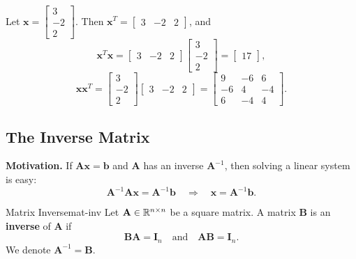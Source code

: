 \begin{example}
  Let $\mathbf{x} =
    \begin{bmatrix}
      3 \\ -2 \\ 2
    \end{bmatrix}
  $. Then $\mathbf{x}^T =
    \begin{bmatrix}
      3 & -2 & 2
    \end{bmatrix}
  $, and
  \[
    \mathbf{x}^T \mathbf{x}
    =
    \begin{bmatrix}
      3 & -2 & 2
    \end{bmatrix}
    \begin{bmatrix}
      3 \\ -2 \\ 2
    \end{bmatrix}
    =
    \begin{bmatrix}
      17
    \end{bmatrix}
    ,
  \]
  \[
    \mathbf{x}\mathbf{x}^T
    =
    \begin{bmatrix}
      3 \\ -2 \\ 2
    \end{bmatrix}
    \begin{bmatrix}
      3 & -2 & 2
    \end{bmatrix}
    =
    \begin{bmatrix}
      9 & -6 & 6 \\ -6 & 4 & -4 \\ 6 & -4 & 4
    \end{bmatrix}
    .
  \]
\end{example}

\subsection{The Inverse Matrix}

\textbf{Motivation.} If $\mathbf{A}\mathbf{x} = \mathbf{b}$ and $\mathbf{A}$ has an inverse $\mathbf{A}^{-1}$, then solving a linear system is easy:
\[
  \mathbf{A}^{-1}\mathbf{A}\mathbf{x} = \mathbf{A}^{-1}\mathbf{b}
  \quad\Longrightarrow\quad
  \mathbf{x} = \mathbf{A}^{-1}\mathbf{b}.
\]

\begin{definition}{Matrix Inverse}{mat-inv}
  Let $\mathbf{A} \in \mathbb{R}^{n \times n}$ be a square matrix. A matrix $\mathbf{B}$ is an \textbf{inverse} of $\mathbf{A}$ if
  \[
    \mathbf{B}\mathbf{A} = \mathbf{I}_n
    \quad\text{and}\quad
    \mathbf{A}\mathbf{B} = \mathbf{I}_n.
  \]
  We denote $\mathbf{A}^{-1} = \mathbf{B}$.
\end{definition}

